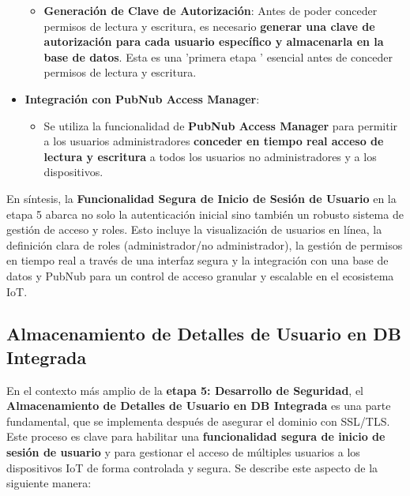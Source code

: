\documentclass{report}
\begin{document}
\begin{itemize}
\begin{itemize}
\begin{enumerate}
        \end{enumerate}
        \item \textbf{Generación de Clave de Autorización}: Antes de poder conceder permisos de lectura y escritura, es necesario \textbf{generar una 
        clave de autorización para cada usuario específico y almacenarla en la base de datos}. Esta es una  'primera etapa ' esencial antes de conceder 
        permisos de lectura y escritura.
    \end{itemize}
    \item \textbf{Integración con PubNub Access Manager}:
    \begin{itemize}
        \item Se utiliza la funcionalidad de \textbf{PubNub Access Manager} para permitir a los usuarios administradores \textbf{conceder en tiempo real 
        acceso de lectura y escritura} a todos los usuarios no administradores y a los dispositivos.
    \end{itemize}
\end{itemize}
En síntesis, la \textbf{Funcionalidad Segura de Inicio de Sesión de Usuario} en la etapa 5 abarca no solo la autenticación inicial sino también un 
robusto sistema de gestión de acceso y roles. Esto incluye la visualización de usuarios en línea, la definición clara de roles 
(administrador/no administrador), la gestión de permisos en tiempo real a través de una interfaz segura y la integración con una base de datos y 
PubNub para un control de acceso granular y escalable en el ecosistema IoT.

\subsection{Almacenamiento de Detalles de Usuario en DB Integrada}
En el contexto más amplio de la \textbf{etapa 5: Desarrollo de Seguridad}, el \textbf{Almacenamiento de Detalles de Usuario en DB Integrada} 
es una parte fundamental, que se implementa después de asegurar el dominio con SSL/TLS. Este proceso es clave para habilitar una 
\textbf{funcionalidad segura de inicio de sesión de usuario} y para gestionar el acceso de múltiples usuarios a los dispositivos IoT de forma 
controlada y segura. Se describe este aspecto de la siguiente manera:
\end{document}

